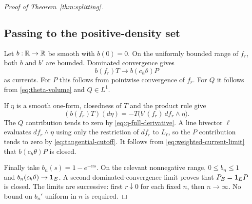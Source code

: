 \begin{proof}[Proof of Theorem~\ref{thm:splitting}]
\subsection*{Passing to the positive-density set}

Let \(b:\mathbb R\to\mathbb R\) be smooth with \(b(0)=0\).
On the uniformly bounded range of \(f_r\), both \(b\)
and \(b'\) are bounded. Dominated convergence gives
\begin{equation}\label{eq:weighted-current-limit}
b(f_r)T\longrightarrow b(c_h\theta)P
\end{equation}
as currents. For \(P\) this follows from pointwise
convergence of \(f_r\). For \(Q\) it follows from
\eqref{eq:theta-volume} and \(Q\in L^1\).

If \(\eta\) is a smooth one-form, closedness of \(T\)
and the product rule give
\[
(b(f_r)T)(d\eta)
=-T\bigl(b'(f_r)\,df_r\wedge\eta\bigr).
\]
The \(Q\) contribution tends to zero by
\eqref{eq:q-full-derivative}. A line bivector \(\ell\)
evaluates \(df_r\wedge\eta\) using only the restriction
of \(df_r\) to \(L_\ell\), so the \(P\) contribution
tends to zero by \eqref{eq:tangential-cutoff}.
It follows from \eqref{eq:weighted-current-limit} that
\(b(c_h\theta)P\) is closed.

Finally take \(b_n(s)=1-e^{-ns}\). On the relevant
nonnegative range, \(0\le b_n\le1\) and
\(b_n(c_h\theta)\to\mathbf 1_E\).
A second dominated-convergence limit proves that
\(P_E=\mathbf 1_EP\) is closed. The limits are successive:
first \(r\downarrow0\) for each fixed \(n\), then
\(n\to\infty\). No bound on \(b_n'\) uniform in \(n\)
is required.
\end{proof}

